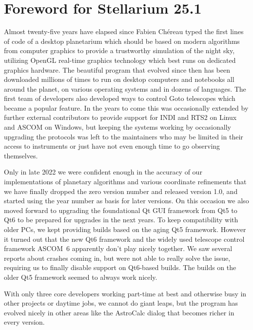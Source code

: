 
\chapter*{Foreword for Stellarium 25.1}
\label{ch:Foreword}


Almost  twenty-five years have elapsed since Fabien Ch\'ereau typed the
first lines of code of a desktop planetarium which should be based on
modern algorithms from computer graphics to provide a trustworthy
simulation of the night sky, utilizing OpenGL real-time graphics technology which best
runs on dedicated graphics hardware. 
%
%
The beautiful program that evolved since then has been 
downloaded millions of times to run on desktop computers and notebooks
all around the planet, on various operating systems and in dozens of
languages. The first team of developers also developed ways to control Goto 
telescopes which became a popular feature. In the years to come this was occasionally 
extended by further external contributors to provide support for INDI and RTS2 on Linux and ASCOM on Windows, 
but keeping the systems working by occasionally upgrading the protocols was left to 
the maintainers who may be limited in their access to instruments or just have 
not even enough time to go observing themselves.  


Only in late 2022 we were confident enough in the accuracy of our implementations of planetary 
algorithms and various coordinate refinements that we have finally dropped the zero version number and 
released version 1.0, and started using the year number as basis for later versions. 
On this occasion we also moved forward to upgrading the foundational Qt GUI framework from Qt5 to Qt6 
to be prepared for upgrades in the next years. To keep compatibility with older PCs, 
we kept providing  builds based on the aging Qt5 framework. 
However it turned out that the new Qt6 framework and the widely used telescope 
control framework ASCOM~6 apparently don't play nicely together. We saw several reports about crashes coming in, 
but were not able to really solve the issue, requiring us to finally disable support on Qt6-based builds. 
The builds on the older Qt5 framework seemed to always work nicely. 



With only three core developers working part-time at best and otherwise busy in other projects or daytime jobs, 
we cannot do giant leaps, but the program has 
evolved nicely in other areas like the AstroCalc dialog that becomes richer in every version. 



